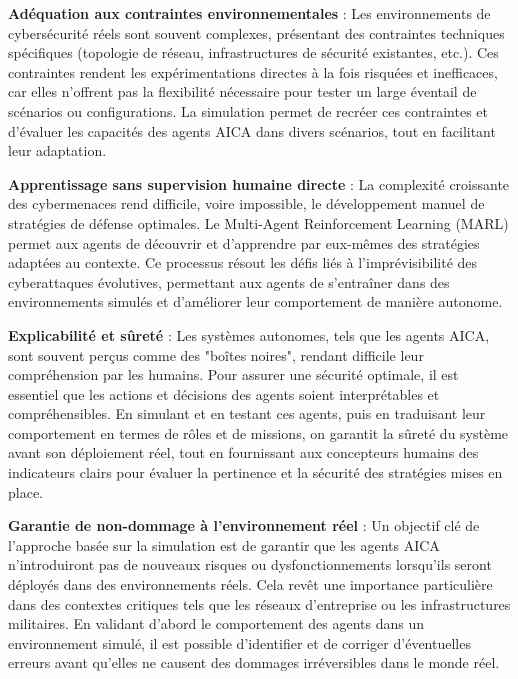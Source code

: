 \textbf{Adéquation aux contraintes environnementales} : Les environnements de cybersécurité réels sont souvent complexes, présentant des contraintes techniques spécifiques (topologie de réseau, infrastructures de sécurité existantes, etc.). Ces contraintes rendent les expérimentations directes à la fois risquées et inefficaces, car elles n'offrent pas la flexibilité nécessaire pour tester un large éventail de scénarios ou configurations. La simulation permet de recréer ces contraintes et d’évaluer les capacités des agents AICA dans divers scénarios, tout en facilitant leur adaptation.

\textbf{Apprentissage sans supervision humaine directe} : La complexité croissante des cybermenaces rend difficile, voire impossible, le développement manuel de stratégies de défense optimales. Le Multi-Agent Reinforcement Learning (MARL) permet aux agents de découvrir et d’apprendre par eux-mêmes des stratégies adaptées au contexte. Ce processus résout les défis liés à l'imprévisibilité des cyberattaques évolutives, permettant aux agents de s'entraîner dans des environnements simulés et d'améliorer leur comportement de manière autonome.

\textbf{Explicabilité et sûreté} : Les systèmes autonomes, tels que les agents AICA, sont souvent perçus comme des "boîtes noires", rendant difficile leur compréhension par les humains. Pour assurer une sécurité optimale, il est essentiel que les actions et décisions des agents soient interprétables et compréhensibles. En simulant et en testant ces agents, puis en traduisant leur comportement en termes de rôles et de missions, on garantit la sûreté du système avant son déploiement réel, tout en fournissant aux concepteurs humains des indicateurs clairs pour évaluer la pertinence et la sécurité des stratégies mises en place.

\textbf{Garantie de non-dommage à l'environnement réel} : Un objectif clé de l’approche basée sur la simulation est de garantir que les agents AICA n’introduiront pas de nouveaux risques ou dysfonctionnements lorsqu'ils seront déployés dans des environnements réels. Cela revêt une importance particulière dans des contextes critiques tels que les réseaux d'entreprise ou les infrastructures militaires. En validant d’abord le comportement des agents dans un environnement simulé, il est possible d’identifier et de corriger d’éventuelles erreurs avant qu’elles ne causent des dommages irréversibles dans le monde réel.

\vspace{0.5cm}

